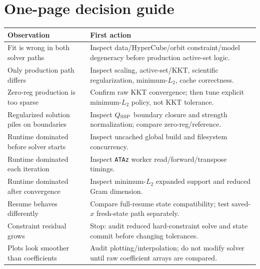 \documentclass[10pt,a4paper]{article}
\newcommand{\code}[1]{\texttt{#1}}
\begin{document}
\section{One-page decision guide}
\begin{longtable}{p{}p{}}
\toprule
\textbf{Observation} & \textbf{First action}\\
\midrule\endhead
Fit is wrong in both solver paths & Inspect data/HyperCube/orbit constraint/model degeneracy before production active-set logic.\\
Only production path differs & Inspect scaling, active-set/KKT, scientific regularization, minimum-$L_2$, cache correctness.\\
Zero-reg production is too sparse & Confirm raw KKT convergence; then tune explicit minimum-$L_2$ policy, not KKT tolerance.\\
Regularized solution piles on boundaries & Inspect $Q_{\rm SSP}$ boundary closure and strength normalization; compare zero-reg/reference.\\
Runtime dominated before solver starts & Inspect uncached global build and filesystem concurrency.\\
Runtime dominated each iteration & Inspect \code{ATAz} worker read/forward/transpose timings.\\
Runtime dominated after convergence & Inspect minimum-$L_2$ expanded support and reduced Gram dimension.\\
Resume behaves differently & Compare full-resume state compatibility; test saved-$x$ fresh-state path separately.\\
Constraint residual grows & Stop: audit reduced hard-constraint solve and state commit before changing tolerances.\\
Plots look smoother than coefficients & Audit plotting/interpolation; do not modify solver until raw coefficient arrays are compared.\\
\bottomrule
\end{longtable}
\end{document}
